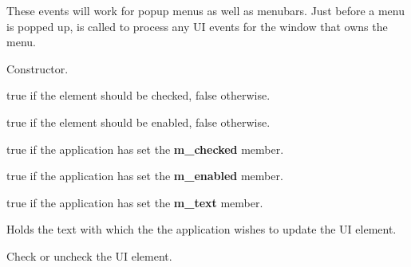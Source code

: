 These events will work for popup menus as well as menubars. Just before a menu is popped
up,  is called to process any UI events for
the window that owns the menu.






Constructor.



true if the element should be checked, false otherwise.



true if the element should be enabled, false otherwise.



true if the application has set the {\bf m\_checked} member.



true if the application has set the {\bf m\_enabled} member.



true if the application has set the {\bf m\_text} member.



Holds the text with which the the application wishes to
update the UI element.

\label{wxupdateuieventcheck}


Check or uncheck the UI element.

\label{wxupdateuieventenable}

